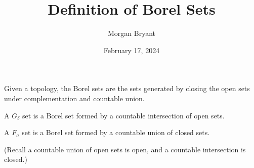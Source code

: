 \documentclass[a4paper]{article}
\title{Definition of Borel Sets}
\date{February 17, 2024}
\author{Morgan Bryant}
\begin{document}
\maketitle
\par{Given a topology, the Borel sets are the sets generated by closing the open sets under complementation and countable union.}\par{A \(G_ \delta\) set is a Borel set formed by a countable intersection of open sets.}\par{A \(F_ \sigma\) set is a Borel set formed by a countable union of closed sets.}\par{(Recall a countable union of open sets is open, and a countable intersection is closed.)}
\printbibliography
\end{document}
